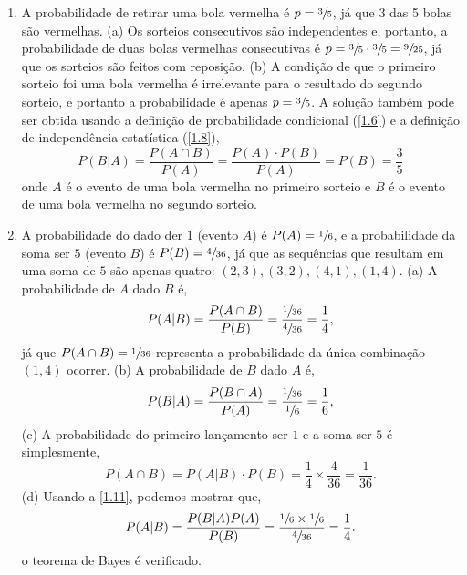 \begin{enumerate}[label=\textbf{1.\arabic*.}]
\item A probabilidade de retirar uma bola vermelha é $p = \sfrac{3}{5}$, já que 3 das 5 bolas são vermelhas. (a) Os sorteios consecutivos são independentes e, portanto, a probabilidade de duas bolas vermelhas consecutivas é $p = \sfrac{3}{5} \cdot \sfrac{3}{5} = \sfrac{9}{25}$, já que os sorteios são feitos com reposição. (b) A condição de que o primeiro sorteio foi uma bola vermelha é irrelevante para o resultado do segundo sorteio, e portanto a probabilidade é apenas $p = \sfrac{3}{5}$. A solução também pode ser obtida usando a definição de probabilidade condicional (\autoref{1.6}) e a definição de independência estatística (\autoref{1.8}),
\begin{equation*}
P(B|A) = \dfrac{P(A \cap B)}{P(A)} = \dfrac{P(A)\cdot P(B)}{P(A)} = P(B) = \dfrac{3}{5}
\end{equation*}
onde $A$ é o evento de uma bola vermelha no primeiro sorteio e $B$ é o evento de uma bola vermelha no segundo sorteio.

\item A probabilidade do dado der $1$ (evento $A$) é $P(A) = \sfrac{1}{6}$, e a probabilidade da soma ser $5$ (evento $B$) é $P(B) = \sfrac{4}{36}$, já que as sequências que resultam em uma soma de $5$ são apenas quatro: $(2,3), (3,2), (4,1), (1,4)$. (a) A probabilidade de $A$ dado $B$ é,
\begin{equation*}
P(A|B) = \dfrac{P(A \cap B)}{P(B)} = \dfrac{\sfrac{1}{36}}{\sfrac{4}{36}} = \dfrac{1}{4},
\end{equation*}
já que $P(A \cap B) = \sfrac{1}{36}$ representa a probabilidade da única combinação $(1, 4)$ ocorrer. (b) A probabilidade de $B$ dado $A$ é,
\begin{equation*}
	P(B|A) = \dfrac{P(B \cap A)}{P(A)} = \dfrac{\sfrac{1}{36}}{\sfrac{1}{6}} = \dfrac{1}{6},
\end{equation*}
(c) A probabilidade do primeiro lançamento ser $1$ e a soma ser $5$ é simplesmente,
\begin{equation*}
P(A \cap B) = P(A|B)\cdot P(B) = \dfrac{1}{4} \times \dfrac{4}{36} = \dfrac{1}{36}.
\end{equation*}
(d) Usando a \autoref{1.11}, podemos mostrar que,
\begin{equation*}
P(A | B) = \dfrac{P(B | A)P(A)}{P(B)} = \dfrac{\sfrac{1}{6} \times \sfrac{1}{6}}{\sfrac{4}{36}} = \dfrac{1}{4}.
\end{equation*}
o teorema de Bayes é verificado.


\end{enumerate}
